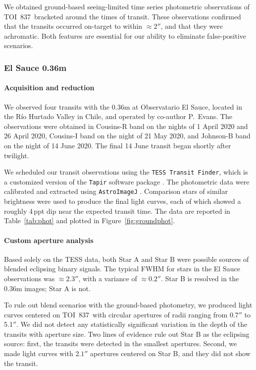 \documentclass[12pt,twocolumn,tighten]{aastex63}
\newcommand{\tn}{TOI~837} %
\begin{document}
We obtained ground-based seeing-limited time series photometric
observations of \tn\ bracketed around the times of transit.  These
observations confirmed that the transits occurred on-target to within
$\approx 2''$, and that they were achromatic. Both features are
essential for our ability to eliminate false-positive scenarios.

\subsubsection{El Sauce 0.36m}

\paragraph{Acquisition and reduction}
We observed four transits with the 0.36m at Observatario El Sauce,
located in the R\'io Hurtado Valley in Chile, and operated by
co-author P{.}~Evans.  The observations were obtained in Cousins-R
band on the nights of 1 April 2020 and 26 April 2020, Cousins-I band
on the night of 21 May 2020, and Johnson-B band on the night of 14
June 2020.  The final 14 June transit began shortly after twilight.

We scheduled our transit observations using the {\tt TESS Transit
Finder}, which is a customized version of the {\tt Tapir} software
package \citep{Jensen:2013}.  The photometric data were calibrated and
extracted using \texttt{AstroImageJ} \citep{collins_astroimagej_2017}.
Comparison stars of similar brightness were used to produce the final
light curves, each of which showed a roughly 4$\,$ppt dip near the
expected transit time.  The data are reported in Table~\ref{tab:phot}
and plotted in Figure~\ref{fig:groundphot}.


\paragraph{Custom aperture analysis}
Based solely on the TESS data, both Star A and Star B were possible
sources of blended eclipsing binary signals.  The typical FWHM for
stars in the El Sauce observations was $\approx 2.3''$, with a
variance of $\approx 0.2''$.  Star B is resolved in the 0.36m images;
Star A is not.

To rule out blend scenarios with the ground-based photometry, we
produced light curves centered on \tn\ with circular apertures of
radii ranging from 0.7$''$ to 5.1$''$.  We did not detect any
statistically significant variation in the depth of the transits with
aperture size.  Two lines of evidence rule out Star B as the eclipsing
source: first, the transits were detected in the smallest apertures.
Second, we made light curves with $2.1''$ apertures centered on Star
B, and they did not show the transit.
\end{document}
